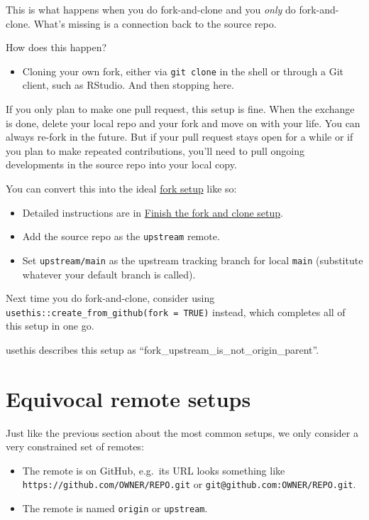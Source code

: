 \documentclass[
]{book}
\providecommand{\tightlist}{%
  \setlength{\itemsep}{0pt}\setlength{\parskip}{0pt}}
\begin{document}
This is what happens when you do fork-and-clone and you \emph{only} do fork-and-clone.
What's missing is a connection back to the source repo.

How does this happen?

\begin{itemize}
\tightlist
\item
  Cloning your own fork, either via \texttt{git\ clone} in the shell or through a Git client, such as RStudio. And then stopping here.
\end{itemize}

If you only plan to make one pull request, this setup is fine.
When the exchange is done, delete your local repo and your fork and move on with your life.
You can always re-fork in the future.
But if your pull request stays open for a while or if you plan to make repeated contributions, you'll need to pull ongoing developments in the source repo into your local copy.

You can convert this into the ideal \hyperref[fork-them]{fork setup} like so:

\begin{itemize}
\tightlist
\item
  Detailed instructions are in
  \hyperref[fork-and-clone-finish]{Finish the fork and clone setup}.
\item
  Add the source repo as the \texttt{upstream} remote.
\item
  Set \texttt{upstream/main} as the upstream tracking branch for local \texttt{main}
  (substitute whatever your default branch is called).
\end{itemize}

Next time you do fork-and-clone, consider using \texttt{usethis::create\_from\_github(fork\ =\ TRUE)} instead, which completes all of this setup in one go.

usethis describes this setup as ``fork\_upstream\_is\_not\_origin\_parent''.

\chapter{Equivocal remote setups}\label{equivocal}

Just like the previous section about the most common setups, we only consider a very constrained set of remotes:

\begin{itemize}
\tightlist
\item
  The remote is on GitHub, e.g.~its URL looks something like \texttt{https://github.com/OWNER/REPO.git} or \texttt{git@github.com:OWNER/REPO.git}.
\item
  The remote is named \texttt{origin} or \texttt{upstream}.
\end{itemize}
\end{document}
